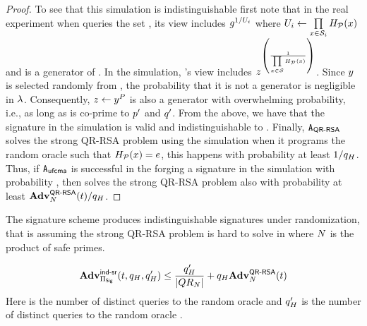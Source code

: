 \begin{proof}
	
\enumListEnd

To see that this simulation is indistinguishable first note that in the real 
experiment when \ufcmaAdversary queries the set 
\genericSetVar, its view includes $\qrGen^{1/\accSet_{\setIdx}}$ 
where $\accSet[\setIdx] \gets \prod\limits_{\genericSetElmt \in \genericSetVar[\setIdx]} 
\primeRO(\genericSetElmt)$ and \qrGen is a generator of \qrGroup. In the simulation, 
\ufcmaAdversary's view includes $\simFnOutput^{\left(\frac{1}{\challengeSetAcc}\right)}$. 
Since $\genericFnOutput$ is selected randomly from 
\qrGroup, the probability that it is not a generator is negligible in $\lambda$. Consequently, $\simFnOutput 
\gets \genericFnOutput^{\randPrimeAccSet}$ is also a generator with overwhelming 
probability, i.e., as long as \randPrimeAccSet is co-prime to $\sgPrime[1]$ and $\sgPrime[2]$. From 
the above, we have that the signature in the simulation is valid and 
indistinguishable to \ufcmaAdversary. Finally, $\rsaAdversary$ solves the strong QR-RSA problem 
using the simulation when it programs the random oracle such that $\primeRO(\genericSetElmt) = 
\rsaExponent$, this happens with probability at least 
$1/q_H$. Thus, if $\ufcmaAdversary$ is successful 
in the forging a signature in the simulation with probability \ufcmaAdv, then \rsaAdversary solves the 
strong QR-RSA problem also with probability at least $\mathbf{Adv}^{\textsf{QR-RSA}}_{N}(t)/q_H$. 
\end{proof}



\begin{theorem}
\label{thm:indsr}
	The signature scheme \sigScheme produces indistinguishable signatures under randomization, that is 
	assuming the strong QR-RSA problem is hard to solve in \qrGroup where $N$ is the product of safe primes.
	
	\[
	\Advantage{\indsrLabel}{\sigScheme}(\timeBound, 
	\oracleQueries, \oracleQueries') \le   \frac{\oracleQueries' }{\setSize{\qrGroup}}  + \oracleQueries 
	\rsaAdv
	\]
Here \oracleQueries is the number of distinct queries to the random oracle \primeRO and 
$q_H'$ is the number of distinct queries to the random oracle \ro.


\end{theorem}


